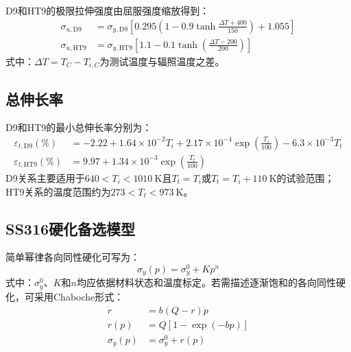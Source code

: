 D9和HT9的极限拉伸强度由屈服强度缩放得到：
\begin{equation}
	\label{eq:appendix_d9_ht9_ultimate_strength}
	\begin{aligned}
		\sigma_{u,\mathrm{D9}}
		&=\sigma_{y,\mathrm{D9}}
		\left[
		0.295\left(1-0.9\tanh\frac{\Delta T+400}{150}\right)
		+1.055
		\right]\\
		\sigma_{u,\mathrm{HT9}}
		&=\sigma_{y,\mathrm{HT9}}
		\left[
		1.1-0.1\tanh\!\left(\frac{\Delta T-200}{200}\right)
		\right]
	\end{aligned}
\end{equation}
\noindent 式中：$\Delta T=T_C-T_{i,C}$为测试温度与辐照温度之差。

\subsection{总伸长率}

D9和HT9的最小总伸长率分别为：
\begin{equation}
	\label{eq:appendix_d9_ht9_total_elongation}
	\begin{aligned}
		\varepsilon_{t,\mathrm{D9}}(\%)
		&=-2.22+1.64\times10^{-2}T_i
		+2.17\times10^{-4}\exp\!\left(\frac{T_i}{100}\right)
		-6.3\times10^{-3}T_t\\
		\varepsilon_{t,\mathrm{HT9}}(\%)
		&=9.97+1.34\times10^{-3}
		\exp\!\left(\frac{T_t}{100}\right)
	\end{aligned}
\end{equation}
D9关系主要适用于$640<T_i<1010\ \mathrm{K}$且$T_t=T_i$或$T_t=T_i+110\ \mathrm{K}$的试验范围；HT9关系的温度范围约为$273<T_t<973\ \mathrm{K}$。

\subsection{SS316硬化备选模型}

简单幂律各向同性硬化可写为：
\begin{equation}
	\sigma_y(p)=\sigma_y^0+Kp^n
	\label{eq:appendix_ss316_power_hardening}
\end{equation}
\noindent 式中：$\sigma_y^0$、$K$和$n$均应依据材料状态和温度标定。若需描述逐渐饱和的各向同性硬化，可采用Chaboche形式：
\begin{equation}
	\label{eq:appendix_ss316_chaboche_isotropic_hardening}
	\begin{aligned}
		\dot r&=b(Q-r)\dot p\\
		r(p)&=Q[1-\exp(-bp)]\\
		\sigma_y(p)&=\sigma_y^0+r(p)
	\end{aligned}
\end{equation}


